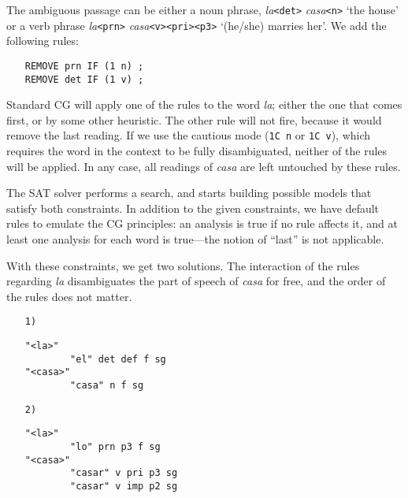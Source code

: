 The ambiguous passage can be either a noun phrase, \emph{la}\texttt{<det>} \emph{casa}\texttt{<n>} 
`the house'  or a verb phrase \emph{la}\texttt{<prn>}  \emph{casa}\texttt{<v><pri><p3>} `(he/she) marries her'. 
We add the following rules:

\begin{itemize}
\item [] \texttt{REMOVE prn IF (1 n) ;} \\
             \texttt{REMOVE det IF (1 v) ;}
\end{itemize}

Standard CG will apply one  of the rules to the word \emph{la}; 
either the one that comes first, or by some other heuristic. 
The other rule will not fire, because it would remove the last
reading. 
If we use the cautious mode (\texttt{1C n} or \texttt{1C v}), which
 requires the word in the context to be fully disambiguated, 
neither of the rules will be applied.
In any case, all readings of \emph{casa} are left untouched by these rules.

The SAT solver performs a search, 
and starts building possible models that satisfy both constraints. 
In addition to the given constraints, we have default rules to emulate
the CG principles: an analysis is true if no rule affects it,
and at least one analysis for each word is true---the notion of
``last'' is not applicable.

With these constraints, we get two solutions. The interaction of the
rules regarding \emph{la}  disambiguates the part of speech of
\emph{casa} for free, and the order of the rules does not matter. 

\begin{enumerate}
\item [\texttt{1)}]
\begin{verbatim}
"<la>"
        "el" det def f sg
"<casa>"
        "casa" n f sg
\end{verbatim}
\item [\texttt{2)}]
\begin{verbatim}
"<la>"
        "lo" prn p3 f sg
"<casa>"
        "casar" v pri p3 sg
        "casar" v imp p2 sg
\end{verbatim}
\end{enumerate} 




